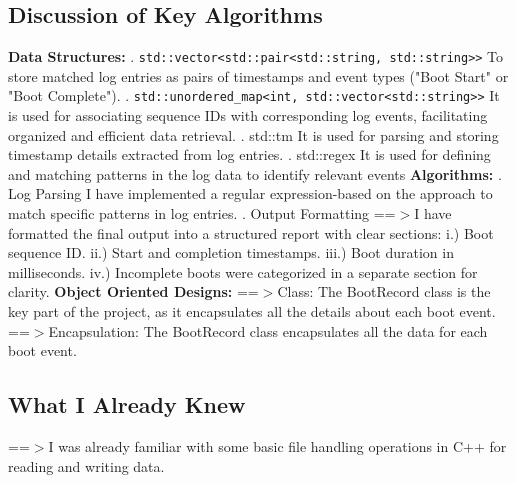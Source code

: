 \documentclass[12pt]{article}
\begin{document}
\subsection{Discussion of Key Algorithms}
\textbf{Data Structures:}
. \texttt{std::vector<std::pair<std::string, std::string>>}
\newline
To store matched log entries as pairs of timestamps and event types ("Boot Start" or "Boot Complete").
. \texttt{std::unordered\_map<int, std::vector<std::string>>}
\newline
It is used for associating sequence IDs with corresponding log events, facilitating organized and efficient data retrieval.
. std::tm 
\newline
It is used for parsing and storing timestamp details extracted from log entries.
. std::regex
\newline
It is used for defining and matching patterns in the log data to identify relevant events
\newline
\textbf{Algorithms:}
. Log Parsing
\newline
I have implemented a regular expression-based on the approach to match specific patterns in log entries.
. Output Formatting
\newline
==$>$I have formatted the final output into a structured report with clear sections:
\newline
i.) Boot sequence ID.
\newline
ii.) Start and completion timestamps.
\newline
iii.) Boot duration in milliseconds.
\newline
iv.) Incomplete boots were categorized in a separate section for clarity.
\newline
\textbf{Object Oriented Designs:}
\newline
==$>$Class:
The BootRecord class is the key part of the project, as it encapsulates all the  details about each boot event.
\newline
==$>$Encapsulation:
\newline 
The BootRecord class encapsulates all the data for each boot event.
\subsection{What I Already Knew}
==$>$I was already familiar with some basic file handling operations in C++ for reading and writing data.
\end{document}
